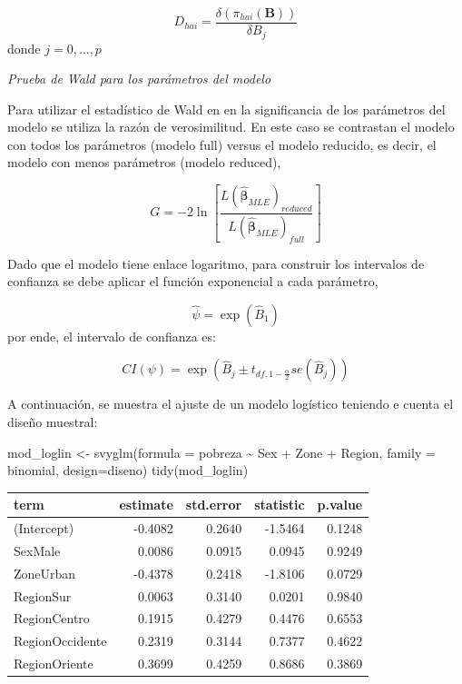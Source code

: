 \documentclass[
  12pt,
]{book}
\newenvironment{Shaded}{\begin{snugshade}}{\end{snugshade}}
\newcommand{\AttributeTok}[1]{\textcolor[rgb]{0.77,0.63,0.00}{#1}}
\newcommand{\FunctionTok}[1]{\textcolor[rgb]{0.00,0.00,0.00}{#1}}
\newcommand{\NormalTok}[1]{#1}
\newcommand{\OtherTok}[1]{\textcolor[rgb]{0.56,0.35,0.01}{#1}}
\newcommand{\SpecialCharTok}[1]{\textcolor[rgb]{0.00,0.00,0.00}{#1}}
\begin{document}
\[
    D_{hai} = \frac{\delta\left(\pi_{hai}\left(\boldsymbol{B}\right)\right)}{\delta B_{j}}
\]
donde \(j=0,\dots,p\)

\emph{Prueba de Wald para los parámetros del modelo}

Para utilizar el estadístico de Wald en en la significancia de los parámetros del modelo se utiliza la razón de verosimilitud. En este caso se contrastan el modelo con todos los parámetros (modelo full) versus el modelo reducido, es decir, el modelo con menos parámetros (modelo reduced),

\[
    G=-2\ln\left[\frac{L\left(\hat{\boldsymbol{\beta}}_{MLE}\right)_{reduced}}{L\left(\hat{\boldsymbol{\beta}}_{MLE}\right)_{full}}\right]
\]

Dado que el modelo tiene enlace logaritmo, para construir los intervalos de confianza se debe aplicar el función exponencial a cada parámetro,

\[
    \hat{\psi}=\exp\left(\hat{B}_{1}\right)
\]
por ende, el intervalo de confianza es:

\[
    CI\left(\psi\right)=\exp\left(\hat{B}_{j}\pm t_{df,1-\frac{\alpha}{2}}se\left(\hat{B}_{j}\right)\right)
\]

A continuación, se muestra el ajuste de un modelo logístico teniendo e cuenta el diseño muestral:

\begin{Shaded}
\begin{Highlighting}[]
\NormalTok{  mod\_loglin }\OtherTok{\textless{}{-}} \FunctionTok{svyglm}\NormalTok{(}\AttributeTok{formula =}\NormalTok{ pobreza }\SpecialCharTok{\textasciitilde{}}\NormalTok{ Sex }\SpecialCharTok{+}\NormalTok{ Zone }\SpecialCharTok{+}\NormalTok{ Region,}
                       \AttributeTok{family =}\NormalTok{ binomial, }
                       \AttributeTok{design=}\NormalTok{diseno)}
  \FunctionTok{tidy}\NormalTok{(mod\_loglin) }
\end{Highlighting}
\end{Shaded}

\begin{tabular}{l|r|r|r|r}
\hline
term & estimate & std.error & statistic & p.value\\
\hline
(Intercept) & -0.4082 & 0.2640 & -1.5464 & 0.1248\\
\hline
SexMale & 0.0086 & 0.0915 & 0.0945 & 0.9249\\
\hline
ZoneUrban & -0.4378 & 0.2418 & -1.8106 & 0.0729\\
\hline
RegionSur & 0.0063 & 0.3140 & 0.0201 & 0.9840\\
\hline
RegionCentro & 0.1915 & 0.4279 & 0.4476 & 0.6553\\
\hline
RegionOccidente & 0.2319 & 0.3144 & 0.7377 & 0.4622\\
\hline
RegionOriente & 0.3699 & 0.4259 & 0.8686 & 0.3869\\
\hline
\end{tabular}
\end{document}
